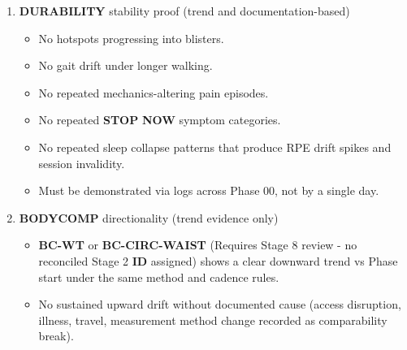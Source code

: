 \documentclass[10pt]{article}
\begin{document}
\begin{enumerate}
\begin{itemize}
\item \textbf{MOB-SHFLEX-WALL} (use Stage 2 \textbf{ID}):
  \begin{itemize}
  \item pass or gap at most 2.0 inches,
  \item without rib flare compensation,
  \item no pain.
  \end{itemize}

\item \textbf{MOB-MOV-SCREEN} (use Stage 2 \textbf{ID}):
  \begin{itemize}
  \item pass or only minor flags with documented plan,
  \item no pain-driven compensation.
  \end{itemize}
\end{itemize}

\item \textbf{DURABILITY} stability proof (trend and documentation-based)

\begin{itemize}
\item No hotspots progressing into blisters.
\item No gait drift under longer walking.
\item No repeated mechanics-altering pain episodes.
\item No repeated \textbf{STOP} \textbf{NOW} symptom categories.
\item No repeated sleep collapse patterns that produce RPE drift spikes and session invalidity.
\item Must be demonstrated via logs across Phase 00, not by a single day.
\end{itemize}

\item \textbf{BODYCOMP} directionality (trend evidence only)

\begin{itemize}
\item \textbf{BC-WT} or \textbf{BC-CIRC-WAIST} (Requires Stage 8 review - no reconciled Stage 2 \textbf{ID} assigned) shows a clear downward trend vs Phase start under the same method and cadence rules.
\item No sustained upward drift without documented cause (access disruption, illness, travel, measurement method change recorded as comparability break).
\end{itemize}
\end{enumerate}
\end{document}
